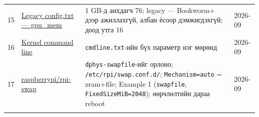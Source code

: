 \begin{longtable}[]{@{}llll@{}}
\begin{minipage}[t]{0.22\columnwidth}
15\strut
\end{minipage} & \begin{minipage}[t]{0.22\columnwidth}\raggedright
\href{https://www.raspberrypi.com/documentation/computers/legacy_config_txt.html}{Legacy config.\allowbreak{}txt --- gpu\_\allowbreak{}mem}\strut
\end{minipage} & \begin{minipage}[t]{0.22\columnwidth}\raggedright
1 GB-д анхдагч 76; legacy --- Bookworm+ дээр ажиллахгүй, албан ёсоор дэмжигдэхгүй; доод утга 16\strut
\end{minipage} & \begin{minipage}[t]{0.22\columnwidth}\raggedright
2026-09\strut
\end{minipage}\tabularnewline
\begin{minipage}[t]{0.22\columnwidth}\raggedright
16\strut
\end{minipage} & \begin{minipage}[t]{0.22\columnwidth}\raggedright
\href{https://www.raspberrypi.com/documentation/computers/configuration.html}{Kernel command line}\strut
\end{minipage} & \begin{minipage}[t]{0.22\columnwidth}\raggedright
\texttt{cmdline.txt}-ийн бүх параметр нэг мөрөнд\strut
\end{minipage} & \begin{minipage}[t]{0.22\columnwidth}\raggedright
2026-09\strut
\end{minipage}\tabularnewline
\begin{minipage}[t]{0.22\columnwidth}\raggedright
17\strut
\end{minipage} & \begin{minipage}[t]{0.22\columnwidth}\raggedright
\href{https://github.com/raspberrypi/rpi-swap}{raspberrypi/rpi-swap}\strut
\end{minipage} & \begin{minipage}[t]{0.22\columnwidth}\raggedright
\texttt{dphys-swapfile}-ийг орлоно; \texttt{/\allowbreak{}etc/\allowbreak{}rpi/\allowbreak{}swap.\allowbreak{}conf.\allowbreak{}d/\allowbreak{}}; \texttt{Mechanism=auto} = zram+file; Example 1 (\texttt{swapfile}, \texttt{FixedSizeMiB=\allowbreak{}2048}); өөрчлөлтийн дараа reboot\strut
\end{minipage} & \begin{minipage}[t]{0.22\columnwidth}\raggedright
2026-09\strut
\end{minipage}\tabularnewline
\begin{minipage}[t]{0.22\columnwidth}\raggedright

\end{minipage}
\end{longtable}
